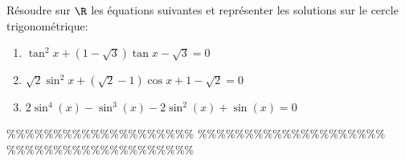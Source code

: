 



\begin{exercice}  \;
R\'esoudre sur $\R$ les \'equations suivantes et repr\'esenter les solutions sur le cercle trigonom\'etrique:
\begin{enumerate}
\item $\tan^2{x}+(1-\sqrt{3})\tan{x}-\sqrt{3}=0$
\item $\sqrt{2}\sin^2{x}+(\sqrt{2}-1)\cos{x}+1-\sqrt{2}=0$
\item $2\sin^4{(x)}-\sin^3{(x)}-2\sin^2{(x)}+\sin{(x)}=0$
\end{enumerate}
\end{exercice}


\%\%\%\%\%\%\%\%\%\%\%\%\%\%\%\%\%\%\%\%
\%\%\%\%\%\%\%\%\%\%\%\%\%\%\%\%\%\%\%\%
\%\%\%\%\%\%\%\%\%\%\%\%\%\%\%\%\%\%\%\%




